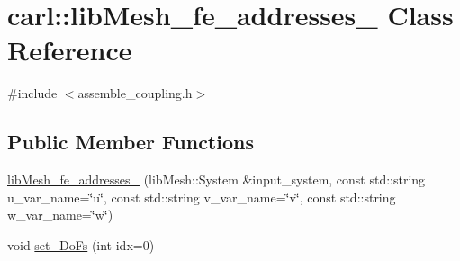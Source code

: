 \hypertarget{classcarl_1_1lib_mesh__fe__addresses__3}{}\section{carl\+:\+:lib\+Mesh\+\_\+fe\+\_\+addresses\+\_ Class Reference}
\label{classcarl_1_1lib_mesh__fe__addresses__3}


{\ttfamily \#include $<$assemble\+\_\+coupling.\+h$>$}

\subsection*{Public Member Functions}
\begin{DoxyCompactItemize}
\item 
\hyperlink{classcarl_1_1lib_mesh__fe__addresses__3_a5ecefb94eec8a2cad6c21ccc12c524d9}{lib\+Mesh\+\_\+fe\+\_\+addresses\+\_} (lib\+Mesh\+::\+System \&input\+\_\+system, const std\+::string u\+\_\+var\+\_\+name=\char`\"{}u\char`\"{}, const std\+::string v\+\_\+var\+\_\+name=\char`\"{}v\char`\"{}, const std\+::string w\+\_\+var\+\_\+name=\char`\"{}w\char`\"{})
\item 
void \hyperlink{classcarl_1_1lib_mesh__fe__addresses__3_a5b3ed2307324193887a1d07708654b15}{set\+\_\+\+Do\+Fs} (int idx=0)
\end{DoxyCompactItemize}
